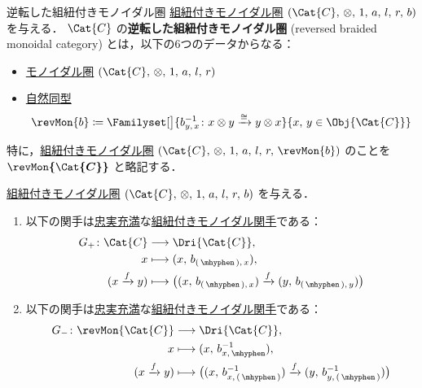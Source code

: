 \documentclass[TQFT_main]{subfiles}
\begin{document}
\begin{mydef}[label=def:rev-braided]{逆転した組紐付きモノイダル圏}
    \hyperref[redef:braided-monoidal]{組紐付きモノイダル圏} $(\Cat{C},\, \otimes,\, 1,\, a,\, l,\, r,\, b)$ を与える．
    $\Cat{C}$ の\textbf{逆転した組紐付きモノイダル圏} (reversed braided monoidal category) とは，以下の6つのデータからなる：
    \begin{itemize}
        \item \hyperref[redef:monoidal-category]{モノイダル圏} $(\Cat{C},\, \otimes,\, 1,\, a,\, l,\, r)$
        \item \hyperref[def:nat]{自然同型}
        \begin{align}
            \revMon{b} \coloneqq \Familyset[\big]{b_{y,\, x}^{-1} \colon x \otimes y \xrightarrow{\cong} y \otimes x}{x,\, y \in \Obj{\Cat{C}}}
        \end{align}
    \end{itemize}
    特に，\hyperref[redef:braided-monoidal]{組紐付きモノイダル圏} $(\Cat{C},\, \otimes,\, 1,\, a,\, l,\, r,\, \revMon{b})$ のことを $\bm{\revMon{\Cat{C}}}$ と略記する．
\end{mydef}

\begin{mylem}[label=lem:rev-center]{}
    \hyperref[redef:braided-monoidal]{組紐付きモノイダル圏} $(\Cat{C},\, \otimes,\, 1,\, a,\, l,\, r,\, b)$ を与える．
    \begin{enumerate}
        \item 以下の関手は\hyperref[def:faithful]{忠実充満}な\hyperref[def:braided-monoidal-functor]{組紐付きモノイダル関手}である：
        \begin{align}
            G_+ \colon \Cat{C} &\lto \Dri{\Cat{C}}, \\
            x &\lmto (x,\, b_{(\, \mhyphen \,),\, x}), \\
            (x \xrightarrow{f} y) &\lmto \bigl( (x,\, b_{(\, \mhyphen \,),\, x}) \xrightarrow{f} (y,\, b_{(\, \mhyphen \,),\, y}) \bigr) 
        \end{align}
        \item 以下の関手は\hyperref[def:faithful]{忠実充満}な\hyperref[def:braided-monoidal-functor]{組紐付きモノイダル関手}である：
        \begin{align}
            G_- \colon \revMon{\Cat{C}} &\lto \Dri{\Cat{C}}, \\
            x &\lmto (x,\, b^{-1}_{x,\, \mhyphen}), \\
            (x \xrightarrow{f} y) &\lmto \bigl( (x,\, b^{-1}_{x,\, (\, \mhyphen \,)}) \xrightarrow{f} (y,\, b^{-1}_{y,\, (\, \mhyphen \,)}) \bigr) 
        \end{align}
    \end{enumerate}
\end{mylem}
\end{document}
